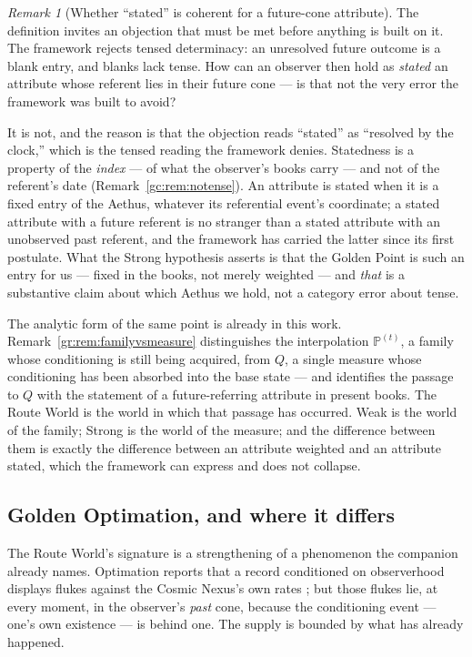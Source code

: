 \documentclass[11pt]{article}
\numberwithin{equation}{section}
\theoremstyle{plain}
\theoremstyle{definition}
\theoremstyle{remark}
\newtheorem{remark}[theorem]{Remark}
\newcommand{\PP}{\mathbb{P}}
\begin{document}
\begin{remark}[Whether ``stated'' is coherent for a future-cone
attribute]\label{gc:rem:statedcoherent}
The definition invites an objection that must be met before anything is
built on it. The framework rejects tensed determinacy: an unresolved
future outcome is a blank entry, and blanks lack tense. How can an
observer then hold as \emph{stated} an attribute whose referent lies in
their future cone --- is that not the very error the framework was built
to avoid?

It is not, and the reason is that the objection reads ``stated'' as
``resolved by the clock,'' which is the tensed reading the framework
denies. Statedness is a property of the \emph{index} --- of what the
observer's books carry --- and not of the referent's date
(Remark~\ref{gc:rem:notense}). An attribute is stated when it is a fixed entry
of the Aethus, whatever its referential event's coordinate; a stated
attribute with a future referent is no stranger than a stated attribute
with an unobserved past referent, and the framework has carried the
latter since its first postulate. What the Strong hypothesis asserts is
that the Golden Point is such an entry for us --- fixed in the books,
not merely weighted --- and \emph{that} is a substantive claim about
which Aethus we hold, not a category error about tense.

The analytic form of the same point is already in this work.
Remark~\ref{gr:rem:familyvsmeasure} distinguishes the interpolation
$\PP^{(t)}$, a family whose conditioning is still being acquired, from
$Q$, a single measure whose conditioning has been absorbed into the base
state --- and identifies the passage to $Q$ with the statement of a
future-referring attribute in present books. The Route World is the
world in which that passage has occurred. Weak is the world of the
family; Strong is the world of the measure; and the difference between
them is exactly the difference between an attribute weighted and an
attribute stated, which the framework can express and does not collapse.
\end{remark}

\subsection{Golden Optimation, and where it differs}\label{gc:sub:goldenopt}

The Route World's
signature is a strengthening of a phenomenon the companion already
names. Optimation reports that a record conditioned on observerhood
displays flukes against the Cosmic Nexus's own rates \cite{Nexus}; but
those flukes lie, at every moment, in the observer's \emph{past} cone,
because the conditioning event --- one's own existence --- is behind one.
The supply is bounded by what has already happened.
\end{document}
